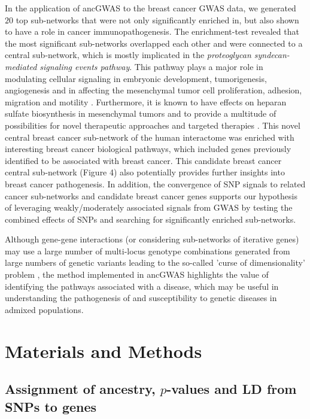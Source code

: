 \documentclass[10pt]{article}
\begin{document}
In the application of ancGWAS to the breast cancer GWAS data, we generated $20$ top sub-networks that were not only significantly enriched in, but also shown to have a role in cancer immunopathogenesis. The enrichment-test revealed that the most significant sub-networks overlapped each other and were connected to a central sub-network, which is mostly implicated in the \textit{proteoglycan syndecan-mediated signaling events pathway}. This pathway plays a major role in modulating cellular signaling in embryonic development, tumorigenesis, angiogenesis and in affecting the mesenchymal tumor cell proliferation, adhesion, migration and motility \cite{breasta,breastb,breastd}. Furthermore, it is known to have effects on heparan sulfate biosynthesis in mesenchymal tumors and to provide a multitude of possibilities for novel therapeutic approaches and targeted therapies \cite{breastb,breastd}. This novel central breast cancer sub-network of the human interactome was enriched with interesting breast cancer biological pathways, which included genes previously identified to be associated with breast cancer. This candidate breast cancer central sub-network (Figure 4) also potentially provides further insights into breast cancer pathogenesis. In addition, the convergence of SNP signals to related cancer sub-networks and candidate breast cancer genes supports our hypothesis of leveraging weakly/moderately associated signals from GWAS by testing the combined effects of SNPs and searching for significantly enriched sub-networks. 

Although gene-gene interactions (or considering sub-networks of iterative genes) may use a large number of multi-locus genotype combinations generated from large numbers of genetic variants leading to the so-called 'curse of dimensionality' problem \cite{bellm}, the method implemented in ancGWAS highlights the value of identifying the pathways associated with a disease, which may be useful in understanding the pathogenesis of and susceptibility to genetic diseases in admixed populations.

 
\section*{Materials and Methods}

\subsection*{Assignment of ancestry, $p$-values and LD from SNPs to genes}
\end{document}
